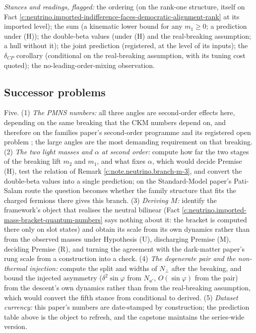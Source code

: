 \documentclass[11pt]{article}
\theoremstyle{definition}
\theoremstyle{plain}
\begin{document}
\emph{Stances and readings, flagged:} the ordering (on the rank-one structure, itself on Fact \ref{c:neutrino.imported-indifference-faces-democratic-alignment-rank} at its imported level); the sum (a kinematic lower bound for any $m_{1} \ge 0$; a prediction under (H)); the double-beta values (under (H) and the real-breaking assumption; a hull without it); the joint prediction (registered, at the level of its inputs); the $\delta_{CP}$ corollary (conditional on the real-breaking assumption, with its tuning cost quoted); the no-leading-order-mixing observation.

\subsection*{Successor problems}
\label{c:note.neutrino.setting-successor-problems}
Five. (1) \emph{The PMNS numbers:} all three angles are second-order effects here, depending on the same breaking that the CKM numbers depend on, and therefore on the families paper's second-order programme and its registered open problem \cite[Prop.~4.3(4), Obs.~7.1]{ButlerT13}; the large angles are the most demanding requirement on that breaking. (2) \emph{The two light masses and $\alpha$ at second order:} compute how far the two stages of the breaking lift $m_{2}$ and $m_{1}$, and what fixes $\alpha$, which would decide Premise (H), test the relation of Remark \ref{c:note.neutrino.branch-m-3}, and convert the double-beta values into a single prediction; on the Standard-Model paper's Pati-Salam route the question becomes whether the family structure that fits the charged fermions there gives this branch. (3) \emph{Deriving $M$:} identify the framework's object that realises the neutral bilinear (Fact \ref{c:neutrino.imported-mass-bracket-quantum-numbers} says nothing about it: the bracket is computed there only on slot states) and obtain its scale from its own dynamics rather than from the observed masses under Hypothesis (U), discharging Premise (M), deciding Premise (R), and turning the agreement with the dark-matter paper's rung scale from a construction into a check. (4) \emph{The degenerate pair and the non-thermal injection:} compute the split and widths of $N_{\perp}$ after the breaking, and bound the injected asymmetry ($\delta^{2}\sin\varphi$ from $N_{u'}$, $O(\sin\varphi)$ from the pair) from the descent's own dynamics rather than from the real-breaking assumption, which would convert the fifth stance from conditional to derived. (5) \emph{Dataset currency:} this paper's numbers are date-stamped by construction; the prediction table above is the object to refresh, and the capstone maintains the series-wide version.
\end{document}
